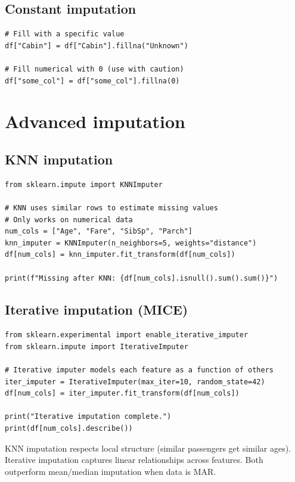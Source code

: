 \subsection{Constant imputation}

\begin{verbatim}
# Fill with a specific value
df["Cabin"] = df["Cabin"].fillna("Unknown")

# Fill numerical with 0 (use with caution)
df["some_col"] = df["some_col"].fillna(0)
\end{verbatim}

\section{Advanced imputation}

\subsection{KNN imputation}

\begin{verbatim}
from sklearn.impute import KNNImputer

# KNN uses similar rows to estimate missing values
# Only works on numerical data
num_cols = ["Age", "Fare", "SibSp", "Parch"]
knn_imputer = KNNImputer(n_neighbors=5, weights="distance")
df[num_cols] = knn_imputer.fit_transform(df[num_cols])

print(f"Missing after KNN: {df[num_cols].isnull().sum().sum()}")
\end{verbatim}

\subsection{Iterative imputation (MICE)}

\begin{verbatim}
from sklearn.experimental import enable_iterative_imputer
from sklearn.impute import IterativeImputer

# Iterative imputer models each feature as a function of others
iter_imputer = IterativeImputer(max_iter=10, random_state=42)
df[num_cols] = iter_imputer.fit_transform(df[num_cols])

print("Iterative imputation complete.")
print(df[num_cols].describe())
\end{verbatim}

\begin{preprocesstip}
KNN imputation respects local structure (similar passengers get similar ages). Iterative imputation captures linear relationships across features. Both outperform mean/median imputation when data is MAR.
\end{preprocesstip}

